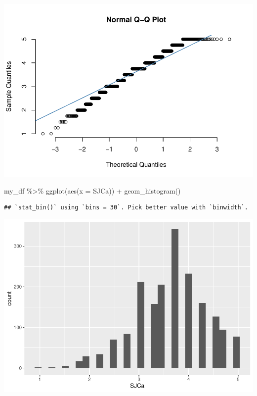 \documentclass[
]{book}
\newenvironment{Shaded}{\begin{snugshade}}{\end{snugshade}}
\newcommand{\AttributeTok}[1]{\textcolor[rgb]{0.77,0.63,0.00}{#1}}
\newcommand{\FunctionTok}[1]{\textcolor[rgb]{0.00,0.00,0.00}{#1}}
\newcommand{\NormalTok}[1]{#1}
\newcommand{\SpecialCharTok}[1]{\textcolor[rgb]{0.00,0.00,0.00}{#1}}
\begin{document}
\includegraphics{test_course_notes_files/figure-latex/unnamed-chunk-72-2.pdf}

\begin{Shaded}
\begin{Highlighting}[]
\NormalTok{my\_df }\SpecialCharTok{\%\textgreater{}\%} \FunctionTok{ggplot}\NormalTok{(}\FunctionTok{aes}\NormalTok{(}\AttributeTok{x =}\NormalTok{ SJCa)) }\SpecialCharTok{+}
  \FunctionTok{geom\_histogram}\NormalTok{()}
\end{Highlighting}
\end{Shaded}

\begin{verbatim}
## `stat_bin()` using `bins = 30`. Pick better value with `binwidth`.
\end{verbatim}

\includegraphics{test_course_notes_files/figure-latex/unnamed-chunk-72-3.pdf}
\end{document}

